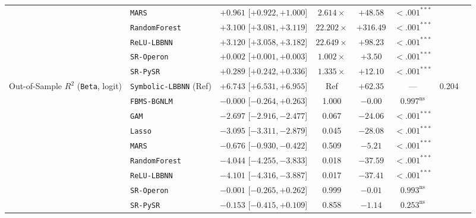 \begin{table}[htbp]
{{\begin{tabular}{llcccccc}
 & \texttt{MARS} & $+0.961$ [$+0.922, +1.000$] & $2.614\times$ & $+48.58$ & $<.001^{***}$ &  \\
 & \texttt{RandomForest} & $+3.100$ [$+3.081, +3.119$] & $22.202\times$ & $+316.49$ & $<.001^{***}$ &  \\
 & \texttt{ReLU-LBBNN} & $+3.120$ [$+3.058, +3.182$] & $22.649\times$ & $+98.23$ & $<.001^{***}$ &  \\
 & \texttt{SR-Operon} & $+0.002$ [$+0.001, +0.003$] & $1.002\times$ & $+3.50$ & $<.001^{***}$ &  \\
 & \texttt{SR-PySR} & $+0.289$ [$+0.242, +0.336$] & $1.335\times$ & $+12.10$ & $<.001^{***}$ &  \\
\midrule
Out-of-Sample $R^2$ (\texttt{Beta}, logit) & \texttt{Symbolic-LBBNN} (Ref) & $+6.743$ [$+6.531, +6.955$] & Ref & $+62.35$ & --- & 0.204 \\
 & \texttt{FBMS-BGNLM} & $-0.000$ [$-0.264, +0.263$] & 1.000 & $-0.00$ & $0.997^{\text{ns}}$ &  \\
 & \texttt{GAM} & $-2.697$ [$-2.916, -2.477$] & 0.067 & $-24.06$ & $<.001^{***}$ &  \\
 & \texttt{Lasso} & $-3.095$ [$-3.311, -2.879$] & 0.045 & $-28.08$ & $<.001^{***}$ &  \\
 & \texttt{MARS} & $-0.676$ [$-0.930, -0.422$] & 0.509 & $-5.21$ & $<.001^{***}$ &  \\
 & \texttt{RandomForest} & $-4.044$ [$-4.255, -3.833$] & 0.018 & $-37.59$ & $<.001^{***}$ &  \\
 & \texttt{ReLU-LBBNN} & $-4.101$ [$-4.316, -3.887$] & 0.017 & $-37.41$ & $<.001^{***}$ &  \\
 & \texttt{SR-Operon} & $-0.001$ [$-0.265, +0.262$] & 0.999 & $-0.01$ & $0.993^{\text{ns}}$ &  \\
 & \texttt{SR-PySR} & $-0.153$ [$-0.415, +0.109$] & 0.858 & $-1.14$ & $0.253^{\text{ns}}$ &  \\
\bottomrule
\end{tabular}%
}
}
\end{table}

